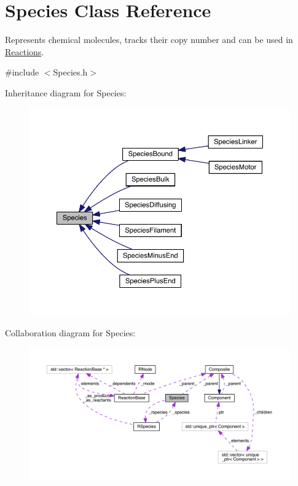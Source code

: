 \hypertarget{classSpecies}{\section{Species Class Reference}
\label{classSpecies}
}


Represents chemical molecules, tracks their copy number and can be used in \hyperlink{classReaction}{Reactions}.  




{\ttfamily \#include $<$Species.\+h$>$}



Inheritance diagram for Species\+:\nopagebreak
\begin{figure}[H]
\begin{center}
\leavevmode
\includegraphics[width=350pt]{classSpecies__inherit__graph}
\end{center}
\end{figure}


Collaboration diagram for Species\+:
\nopagebreak
\begin{figure}[H]
\begin{center}
\leavevmode
\includegraphics[width=350pt]{classSpecies__coll__graph}
\end{center}
\end{figure}
